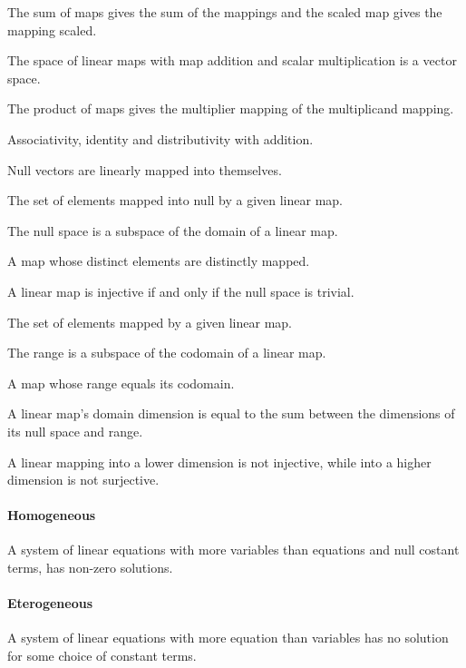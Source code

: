 \begin{multicols}{3}
  The sum of maps gives the sum of the mappings and the scaled map gives the mapping scaled.
  
  The space of linear maps with map addition and scalar multiplication is a vector space.

  The product of maps gives the multiplier mapping of the multiplicand mapping.

  Associativity, identity and distributivity with addition.

  Null vectors are linearly mapped into themselves.

  The set of elements mapped into null by a given linear map.

  The null space is a subspace of the domain of a linear map.

  A map whose distinct elements are distinctly mapped.

  A linear map is injective if and only if the null space is trivial.

  The set of elements mapped by a given linear map.

  The range is a subspace of the codomain of a linear map.

  A map whose range equals its codomain.

  A linear map's domain dimension is equal to the sum between the dimensions of its null space and range.

  A linear mapping into a lower dimension is not injective, while into a higher dimension is not surjective.

  \paragraph{\textbf{Homogeneous}}
  A system of linear equations with more variables than equations and null costant terms, has non-zero solutions.
  
  \paragraph{\textbf{Eterogeneous}}
  A system of linear equations with more equation than variables has no solution for some choice of constant terms.
  

\end{multicols}

